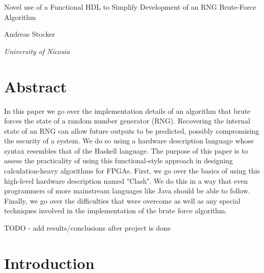 \documentclass{article}
\begin{document}
    \begin{center}
    \end{center}
    
    \addvspace{20mm}
        
    \begin{center}
        \huge Novel use of a Functional HDL to Simplify Development of an RNG Brute-Force Algorithm
    \end{center}
    
    \begin{center}
    \end{center}
       
    \begin{center}
        \large Andreas Stocker
    \end{center}
    
    \begin{center}
        \small \emph {University of Nicosia}
    \end{center}

    \addvspace{15mm}

    \section*{Abstract}

    In this paper we go over the implementation details of an algorithm that brute forces
    the state of a random number generator (RNG). Recovering the internal state of an RNG can allow
    future outputs to be predicted, possibly compromising the security of a system.
    We do so using a hardware description language whose syntax
    resembles that of the Haskell language.
    The purpose of this paper is to assess the practicality of using this functional-style approach in
    designing calculation-heavy algorithms for FPGAs.
    First, we go over the basics of using this high-level hardware description named "Clash".
    We do this in a way that even programmers of more mainstream languages like Java should be able to follow.
    Finally, we go over the difficulties that were overcome as well as any special techniques involved in
    the implementation of the brute force algorithm.

    TODO - add results/conclusions after project is done

    \section{Introduction}
\end{document}

